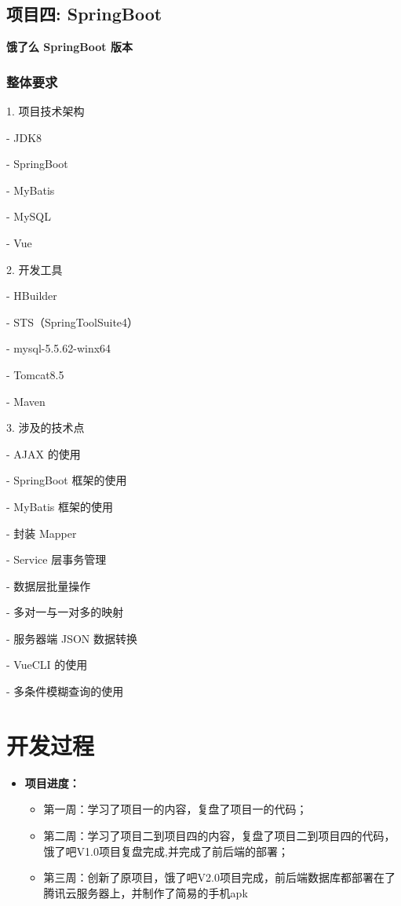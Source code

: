 \subsection{项目四: SpringBoot}
\textbf{饿了么 SpringBoot 版本}

\subsubsection{整体要求}
1. 项目技术架构

- JDK8

- SpringBoot

- MyBatis

- MySQL

- Vue



2. 开发工具

- HBuilder

- STS（SpringToolSuite4）

- mysql-5.5.62-winx64

- Tomcat8.5

- Maven



3. 涉及的技术点

- AJAX 的使用

- SpringBoot 框架的使用

- MyBatis 框架的使用

- 封装 Mapper

- Service 层事务管理

- 数据层批量操作

- 多对一与一对多的映射

- 服务器端 JSON 数据转换

- VueCLI 的使用

- 多条件模糊查询的使用

\section{开发过程}

\begin{itemize}
    \item \textbf{项目进度：}
    \begin{itemize}
        \item 第一周：学习了项目一的内容，复盘了项目一的代码；
        \item 第二周：学习了项目二到项目四的内容，复盘了项目二到项目四的代码，饿了吧V1.0项目复盘完成,并完成了前后端的部署；
        \item 第三周：创新了原项目，饿了吧V2.0项目完成，前后端数据库都部署在了腾讯云服务器上，并制作了简易的手机apk
    \end{itemize}
\end{itemize}

